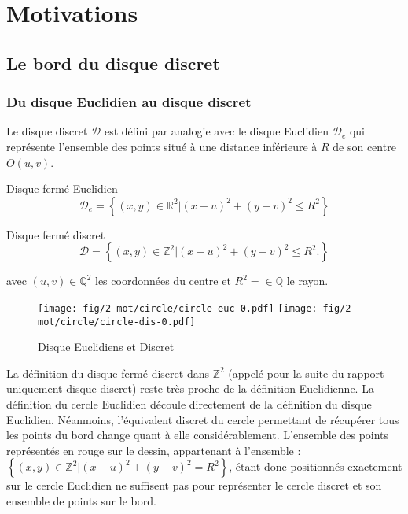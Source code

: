 \section{Motivations}

\subsection{Le bord du disque discret}

\subsubsection{Du disque Euclidien au disque discret}


Le disque discret $\mathcal{D}$ est défini par analogie avec le disque Euclidien $\mathcal{D}_e$ qui représente l'ensemble des points situé à une distance inférieure à $R$ de son centre $O(u,v)$.


\begin{Definition}{Disque fermé Euclidien}
\label{def:disk-euc}
 $$\mathcal{D}_e =  \left\{ (x,y) \in \mathbb{R}^{2} |  (x - u)^2 + (y - v)^2 \leq R^2 \right\}$$
\end{Definition}

\begin{Definition}{Disque fermé discret}
\label{def:disk-dis}
  $$\mathcal{D} =  \left\{ (x,y) \in \mathbb{Z}^{2} |  (x - u)^2 + (y - v)^2 \leq R^2. \right\}$$
  
  avec $(u,v) \in \mathbb{Q}^{2}$ les coordonnées du centre et $R^2 = \in \mathbb{Q}$ le rayon.\\
\end{Definition}

\begin{figure}[H]
  \centering
  \texttt{[image: fig/2-mot/circle/circle-euc-0.pdf]}
  \texttt{[image: fig/2-mot/circle/circle-dis-0.pdf]}
  \caption{Disque Euclidiens et Discret}
\end{figure}

La définition du disque fermé discret dans $\mathbb{Z}^{2}$ (appelé pour la suite du rapport uniquement disque discret) reste très proche de la définition Euclidienne. La définition du cercle Euclidien découle directement de la définition du disque Euclidien. Néanmoins, l'équivalent discret du cercle permettant de récupérer tous les points du bord change quant à elle considérablement. L'ensemble des points représentés en rouge sur le dessin, appartenant à l'ensemble : $\left\{ (x,y) \in \mathbb{Z}^{2} |  (x - u)^2 + (y - v)^2 = R^2 \right\}$, étant donc positionnés exactement sur le cercle Euclidien ne suffisent pas pour représenter le cercle discret et son ensemble de points sur le bord. 

